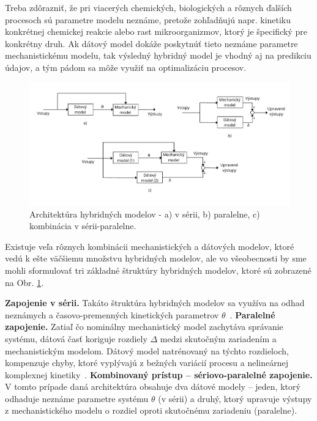Treba zdôrazniť, že pri viacerých chemických, biologických a rôznych ďalších procesoch sú parametre modelu neznáme, pretože zohľadňujú napr. kinetiku konkrétnej chemickej reakcie alebo rast mikroorganizmov, ktorý je špecifický pre konkrétny druh. Ak dátový model dokáže poskytnúť tieto neznáme parametre mechanistickému modelu, tak výsledný hybridný model je vhodný aj na predikciu údajov, a tým pádom sa môže využiť na optimalizáciu procesov.
\begin{figure}
	\centering
	\includegraphics[width=\linewidth]{images/hybrid_model}
	\caption{Architektúra hybridných modelov - a) v sérii, b) paralelne, c) kombinácia v sérii-paralelne.}
	\label{fig:hybrid_model_general}
\end{figure} 

Existuje veľa rôznych kombinácii mechanistických a dátových modelov, ktoré vedú k ešte väčšiemu množstvu hybridných modelov, ale vo všeobecnosti by sme mohli sformulovať tri základné štruktúry hybridných modelov, ktoré sú zobrazené na Obr. \ref{fig:hybrid_model_general}.

\textbf{Zapojenie v sérii.} Takáto štruktúra hybridných modelov sa využíva na odhad neznámych  a časovo-premenných kinetických parametrov $ \theta $~\cite{bhutani:hybrid_modelling_opt:2006}.\newline
\textbf{Paralelné zapojenie.} Zatiaľ čo nominálny mechanistický model zachytáva správanie systému, dátová časť koriguje rozdiely $ \Delta $ medzi skutočným zariadením a mechanistickým modelom. Dátový model natrénovaný na týchto rozdieloch, kompenzuje chyby, ktoré vyplývajú z bežných variácií procesu a nelineárnej komplexnej kinetiky~\cite{bhutani:hybrid_modelling_opt:2006}.\newline
\textbf{Kombinovaný prístup -- sériovo-paralelné zapojenie.} V tomto prípade daná architektúra obsahuje dva dátové modely -- jeden, ktorý odhaduje neznáme parametre systému $ \theta $ (v sérii) a druhý, ktorý upravuje výstupy z mechanistického modelu o rozdiel oproti skutočnému zariadeniu (paralelne). 

